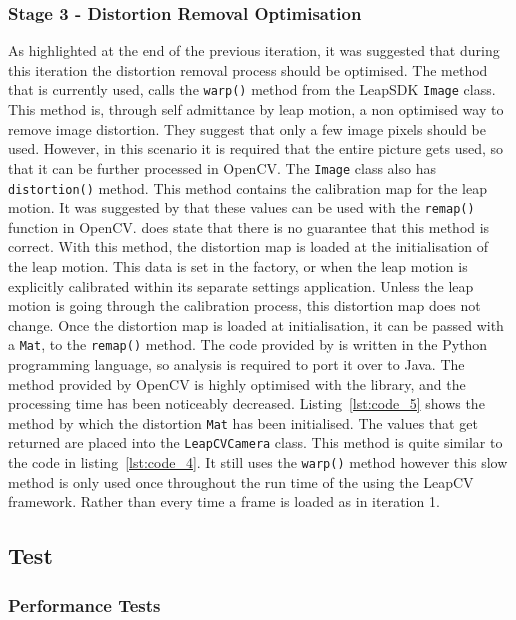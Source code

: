 \documentclass[11pt,oneside]{report}
\newcommand\code[1]{\texttt{#1}}
\begin{document}
		\subsubsection{Stage 3 - Distortion Removal Optimisation}
			As highlighted at the end of the previous iteration, it was suggested that during this iteration the distortion removal process should be optimised.
			The method that is currently used, calls the \code{warp()} method from the LeapSDK \code{Image} class.
			This method is, through self admittance by leap motion, a non optimised way to remove image distortion.
			They suggest that only a few image pixels should be used.
			However, in this scenario it is required that the entire picture gets used, so that it can be further processed in OpenCV.
			The \code{Image} class also has \code{distortion()} method.
			This method contains the calibration map for the leap motion.
			It was suggested by  that these values can be used with the \code{remap()} function in OpenCV.
			 does state that there is no guarantee that this method is correct.
			With this method, the distortion map is loaded at the initialisation of the leap motion.
			This data is set in the factory, or when the leap motion is explicitly calibrated within its separate settings application.
			Unless the leap motion is going through the calibration process, this distortion map does not change.
			Once the distortion map is loaded at initialisation, it can be passed with a \code{Mat}, to the \code{remap()} method.
			The code provided by  is written in the Python programming language, so analysis is required to port it over to Java.
			The method provided by OpenCV is highly optimised with the library, and the processing time has been noticeably decreased.
			Listing~\ref{lst:code_5} shows the method by which the distortion \code{Mat} has been initialised.
			The values that get returned are placed into the \code{LeapCVCamera} class.
			This method is quite similar to the code in listing~\ref{lst:code_4}.
			It still uses the \code{warp()} method however this slow method is only used once throughout the run time of the using the LeapCV framework.
			Rather than every time a frame is loaded as in iteration 1.
			
		\subsection{Test}
			\subsubsection{Performance Tests}
			
\end{document}
